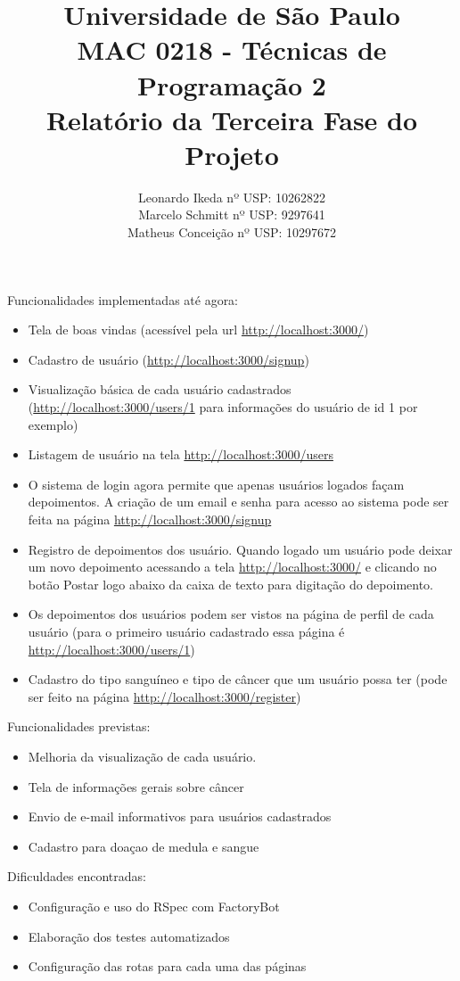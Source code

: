 \documentclass[12pt,a4paper]{article}
\title{{\bf Universidade de São Paulo} \\MAC 0218 - Técnicas de Programação 2 \\ Relatório da Terceira Fase do Projeto}
\author{Leonardo Ikeda     nº USP: 10262822 \\
	    Marcelo Schmitt    nº USP: 9297641\\
	    Matheus Conceição  nº USP: 10297672}
\begin{document}
\date{}
\maketitle


\noindent Funcionalidades implementadas até agora:
\begin{itemize}
	\item Tela de boas vindas (acessível pela url \url{http://localhost:3000/})
	\item Cadastro de usuário (\url{http://localhost:3000/signup})
	\item Visualização básica de cada usuário cadastrados (\url{http://localhost:3000/users/1} para informações do usuário de id 1 por exemplo)
	\item Listagem de usuário na tela \url{http://localhost:3000/users}
	\item O sistema de login agora permite que apenas usuários logados façam depoimentos. A criação de um email e senha para acesso ao sistema pode ser feita na página \url{http://localhost:3000/signup}
	\item Registro de depoimentos dos usuário. Quando logado um usuário pode deixar um novo depoimento acessando a tela \url{http://localhost:3000/} e clicando no botão Postar logo abaixo da caixa de texto para digitação do depoimento.
	\item Os depoimentos dos usuários podem ser vistos na página de perfil de cada usuário (para o primeiro usuário cadastrado essa página é \url{http://localhost:3000/users/1})
	\item Cadastro do tipo sanguíneo e tipo de câncer que um usuário possa ter (pode ser feito na página \url{http://localhost:3000/register})

\end{itemize}

\noindent Funcionalidades previstas:
\begin{itemize}
	\item Melhoria da visualização de cada usuário.
	\item Tela de informações gerais sobre câncer
	\item Envio de e-mail informativos para usuários cadastrados
	\item Cadastro para doaçao de medula e sangue
\end{itemize}

\noindent Dificuldades encontradas:
\begin{itemize}
	\item Configuração e uso do RSpec com FactoryBot
	\item Elaboração dos testes automatizados
	\item Configuração das rotas para cada uma das páginas
\end{itemize}
\end{document}
